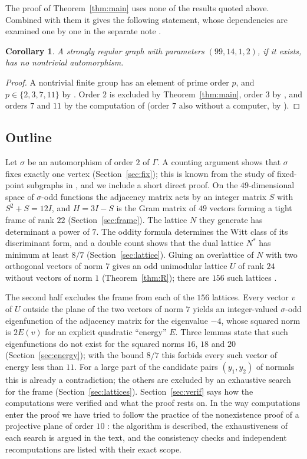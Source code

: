 \documentclass[11pt]{amsart}
\newtheorem{corollary}[theorem]{Corollary}
\theoremstyle{definition}
\theoremstyle{remark}
\newcommand{\G}{\Gamma}
\newcommand{\s}{\sigma}
\begin{document}
The proof of Theorem~\ref{thm:main} uses none of the results quoted above. Combined with them it gives the following
statement, whose dependencies are examined one by one in the separate note \cite{Note}.

\begin{corollary}\label{cor:asym}
A strongly regular graph with parameters $(99,14,1,2)$, if it exists, has no nontrivial automorphism.
\end{corollary}

\begin{proof}
A nontrivial finite group has an element of prime order $p$, and $p\in\{2,3,7,11\}$ by \cite{MM}. Order $2$ is excluded by
Theorem~\ref{thm:main}, order $3$ by \cite{D3}, and orders $7$ and $11$ by the computation of \cite{BL} (order $7$ also
without a computer, by \cite{D7}).
\end{proof}

\subsection*{Outline}
Let $\s$ be an automorphism of order $2$ of $\G$. A counting argument shows that $\s$ fixes exactly one vertex
(Section~\ref{sec:fix}); this is known from the study of fixed-point subgraphs in \cite{MM}, and we include a short direct
proof. On the $49$-dimensional space of $\s$-odd functions the adjacency matrix acts by an integer matrix $S$ with
$S^2+S=12I$, and $H=3I-S$ is the Gram matrix of $49$ vectors forming a tight frame of rank $22$ (Section~\ref{sec:frame}).
The lattice $N$ they generate has determinant a power of $7$. The oddity formula determines the Witt class of its
discriminant form, and a double count shows that the dual lattice $N^*$ has minimum at least $8/7$
(Section~\ref{sec:lattice}). Gluing an overlattice of $N$ with two orthogonal vectors of norm $7$ gives an odd unimodular
lattice $U$ of rank $24$ without vectors of norm $1$ (Theorem~\ref{thm:R}); there are $156$ such lattices \cite{Bor}.

The second half excludes the frame from each of the $156$ lattices. Every vector $v$ of $U$ outside the plane of the two
vectors of norm $7$ yields an integer-valued $\s$-odd eigenfunction of the adjacency matrix for the eigenvalue $-4$, whose
squared norm is $2E(v)$ for an explicit quadratic ``energy'' $E$. Three lemmas state that such eigenfunctions do not exist for the squared norms $16$, $18$ and $20$
(Section~\ref{sec:energy}); with the bound $8/7$ this forbids every such vector of energy less than $11$. For a large part of the
candidate pairs $(y_1,y_2)$ of normals this is already a contradiction; the others are excluded by an exhaustive search for
the frame (Section~\ref{sec:lattices}). Section~\ref{sec:verif} says how the computations were verified and what the proof
rests on. In the way computations enter the proof we have tried to follow the practice of the nonexistence proof of a
projective plane of order $10$ \cite{LTS}: the algorithm is described, the exhaustiveness of each search is argued in the
text, and the consistency checks and independent recomputations are listed with their exact scope.
\end{document}

